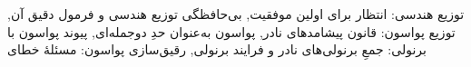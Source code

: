 \documentclass[a4paper,11pt,oneside,openany]{book}
\begin{document}
  {{توزیع هندسی: انتظار برای اولین موفقیت},
   {بی‌حافظگی توزیع هندسی و فرمول دقیق آن},
   {توزیع پواسون: قانون پیشامدهای نادر},
   {پواسون به‌عنوان حدِ دوجمله‌ای},
   {پیوند پواسون با برنولی: جمعِ برنولی‌های نادر و فرایند برنولی},
   {رقیق‌سازی پواسون: مسئلهٔ خطای }}

\mainmatter
\setcounter{chapter}{5}   %

\end{document}
